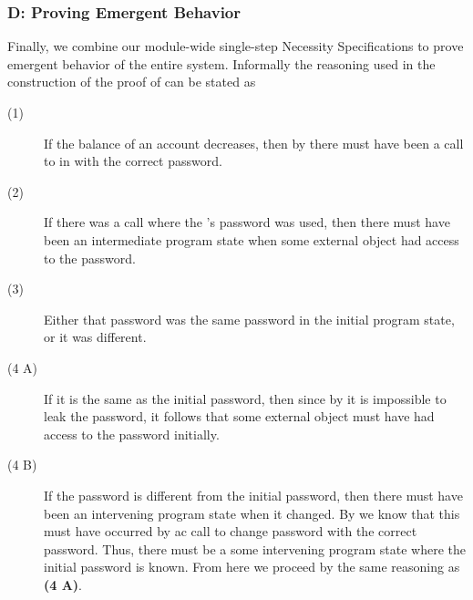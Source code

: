 \subsubsection{D: Proving Emergent Behavior}
Finally, we combine our module-wide single-step Necessity Specifications to 
prove emergent behavior of the entire system. Informally the
reasoning used in the construction of the proof of  can be stated as
\begin{description}
\item [(1)]
If the balance of an account decreases, then
by  there must have been a call
to  in  with the correct password.
\item [(2)]
If there was a call where the 's password 
was used, then there must have been an intermediate program state
when some external object had access to the password.
\item [(3)]
Either that password was the same password in the initial 
program state, or it was different.
\item [(4 A)]
If it is the same as the initial password, then since by 
it is impossible to leak the password, it follows that some external object 
must have had access to the password initially.
\item [(4 B)]
If the password is different from the initial password, 
then there must have been an intervening program state when it 
changed. By  we know that this must have occurred
by ac call to change password with the correct password. Thus,
there must be a some intervening program state where the initial
password is known. From here we proceed by the same reasoning 
as \textbf{(4 A)}.
\end{description}
